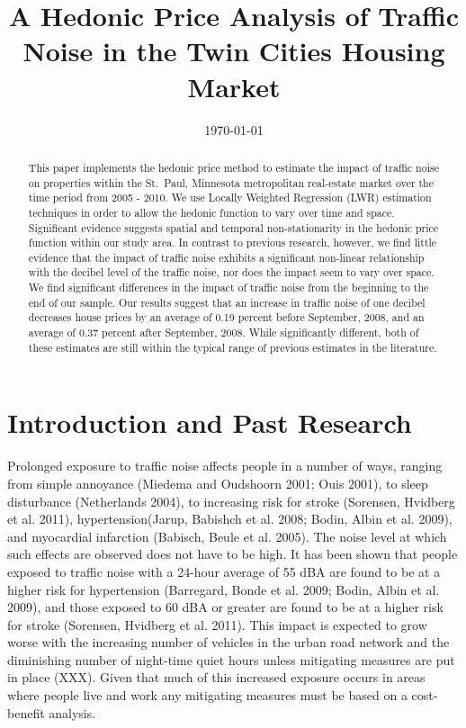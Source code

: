 \documentclass{article}\usepackage{graphicx, color}
\title{A Hedonic Price Analysis of Traffic Noise in the Twin Cities Housing Market}
\date{\today}
\begin{document}
\maketitle

\begin{abstract}
This paper implements the hedonic price method to estimate the impact of traffic noise on properties within the St.\ Paul, Minnesota metropolitan real-estate market over the time period from 2005 - 2010. We use Locally Weighted Regression (LWR) estimation techniques in order to allow the hedonic function to vary over time and space. Significant evidence suggests spatial and temporal non-stationarity in the hedonic price function within our study area. In contrast to previous research, however, we find little evidence that the impact of traffic noise exhibits a significant non-linear relationship with the decibel level of the traffic noise, nor does the impact seem to vary over space. We find significant differences in the impact of traffic noise from the beginning to the end of our sample. Our results suggest that an increase in traffic noise of one decibel decreases house prices by an average of 0.19 percent before September, 2008, and an average of 0.37 percent after September, 2008. While significantly different, both of these estimates are still within the typical range of previous estimates in the literature.
\end{abstract}

\section{Introduction and Past Research}\label{sec:lit}
Prolonged exposure to traffic noise affects people in a number of ways, ranging from simple annoyance (Miedema and Oudshoorn 2001; Ouis 2001), to sleep disturbance (Netherlands 2004), to increasing risk for stroke (Sorensen, Hvidberg et al. 2011), hypertension(Jarup, Babishch et al. 2008; Bodin, Albin et al. 2009), and myocardial infarction (Babisch, Beule et al. 2005). The noise level at which such effects are observed does not have to be high.  It has been shown that people exposed to traffic noise with a 24-hour average of 55 dBA are found to be at a higher risk for hypertension (Barregard, Bonde et al. 2009; Bodin, Albin et al. 2009), and those exposed to 60 dBA or greater are found to be at a higher risk for stroke (Sorensen, Hvidberg et al. 2011).  This impact is expected to grow worse with the increasing number of vehicles in the urban road network and the diminishing number of night-time quiet hours unless mitigating measures are put in place (XXX).  Given that much of this increased exposure occurs in areas where people live and work any mitigating measures must be based on a cost-benefit analysis.  
\end{document}

